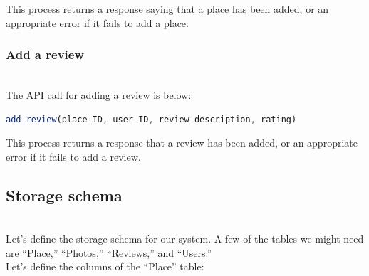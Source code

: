 This process returns a response saying that a place has been added, or an appropriate error if it fails to add a place.

\subsubsection{Add a review}\label{G9ihCBTrmXrFysp16_ygh}
\\
The API call for adding a review is below:

\begin{lstlisting}[language=JavaScript]
add_review(place_ID, user_ID, review_description, rating)
\end{lstlisting}

\begin{table}[htbp]
\centering
\small
{}
\end{table}

This process returns a response that a review has been added, or an appropriate error if it fails to add a review.

\subsection{Storage schema}\label{umw_dT_-eJdkCm7Fuq7U1}
\\
Let's define the storage schema for our system. A few of the tables we might need are ``Place,'' ``Photos,'' ``Reviews,'' and ``Users.''
\\
Let's define the columns of the ``Place'' table:

